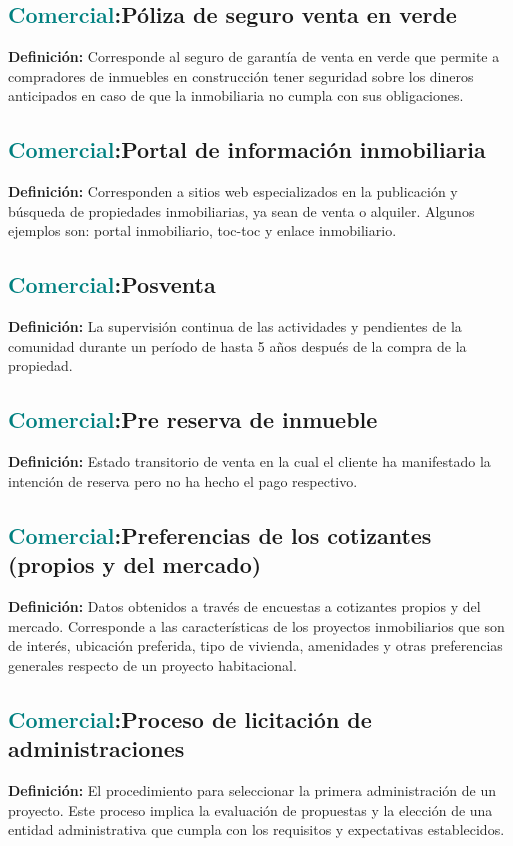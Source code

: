 \documentclass[12pt]{article}
\begin{document}
\subsection{\textcolor{teal}{Comercial}:{Póliza de seguro venta en verde}}
\textbf{Definición:} Corresponde al seguro de garantía de venta en verde que permite a compradores de inmuebles en construcción tener seguridad sobre los dineros anticipados en caso de que la inmobiliaria no cumpla con sus obligaciones.
\subsection{\textcolor{teal}{Comercial}:{Portal de información inmobiliaria}}
\textbf{Definición:} Corresponden a sitios web especializados en la publicación y búsqueda de propiedades inmobiliarias, ya sean de venta o alquiler. Algunos ejemplos son: portal inmobiliario, toc-toc y enlace inmobiliario.
\subsection{\textcolor{teal}{Comercial}:{Posventa}}
\textbf{Definición:} La supervisión continua de las actividades y pendientes de la comunidad durante un período de hasta 5 años después de la compra de la propiedad.
\subsection{\textcolor{teal}{Comercial}:{Pre reserva de inmueble}}
\textbf{Definición:} Estado transitorio de venta en la cual el cliente ha manifestado la intención de reserva pero no ha hecho el pago respectivo.
\subsection{\textcolor{teal}{Comercial}:{Preferencias de los cotizantes (propios y del mercado)}}
\textbf{Definición:} Datos obtenidos a través de encuestas a cotizantes propios y del mercado. Corresponde a las características de los proyectos inmobiliarios que son de interés, ubicación preferida, tipo de vivienda, amenidades y otras preferencias generales respecto de un proyecto habitacional.
\subsection{\textcolor{teal}{Comercial}:{Proceso de licitación de administraciones}}
\textbf{Definición:} El procedimiento para seleccionar la primera administración de un proyecto. Este proceso implica la evaluación de propuestas y la elección de una entidad administrativa que cumpla con los requisitos y expectativas establecidos.
\end{document}
